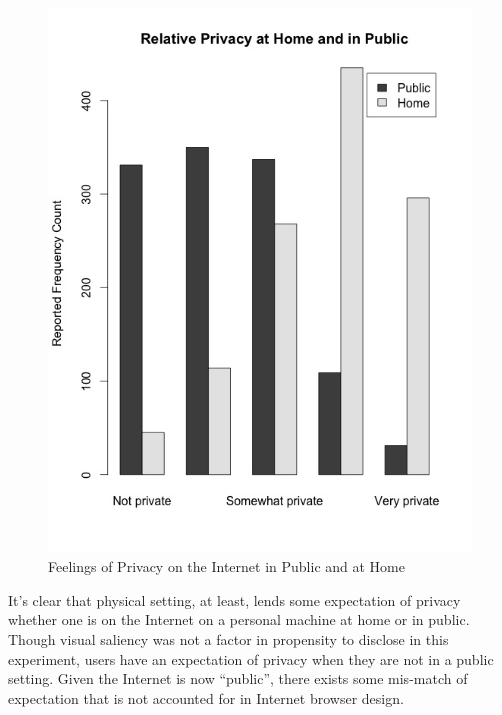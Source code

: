 \begin{figure}
\centerline{
\includegraphics[scale=.5]{chapter7.tex/exp3-graph}
}
\caption{Feelings of Privacy on the Internet in Public and at Home}
\label{privacy}
\end{figure}

It's clear that physical setting, at least, lends some expectation of privacy whether one is on the Internet on a personal machine at home or in public. Though visual saliency was not a factor in propensity to disclose in this experiment, users have an expectation of privacy when they are not in a public setting. Given the Internet is now ``public'', there exists some mis-match of expectation that is not accounted for in Internet browser design.
